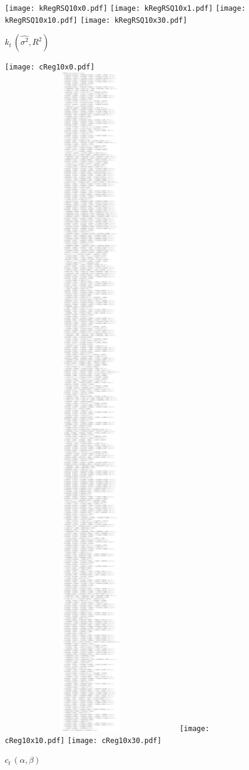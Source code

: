 \documentclass[12pt]{article}
\begin{document}
\begin{figure}
  \centering
  \texttt{[image: kRegRSQ10x0.pdf]}
  \texttt{[image: kRegRSQ10x1.pdf]}
  \texttt{[image: kRegRSQ10x10.pdf]}
  \texttt{[image: kRegRSQ10x30.pdf]}
  \caption{$k_t\, (\hat{\sigma^2},R^2) $   \label{fig:fork} }

\end{figure}



\begin{figure}
  \centering
  \texttt{[image: cReg10x0.pdf]}
  \includegraphics[width=3.0in]{cReg10x1.pdf}
  \texttt{[image: cReg10x10.pdf]}
  \texttt{[image: cReg10x30.pdf]}
  \caption{$c_t\, (\alpha,\beta)$ \label{fig:forcn}}
  

\end{figure}
\end{document}

